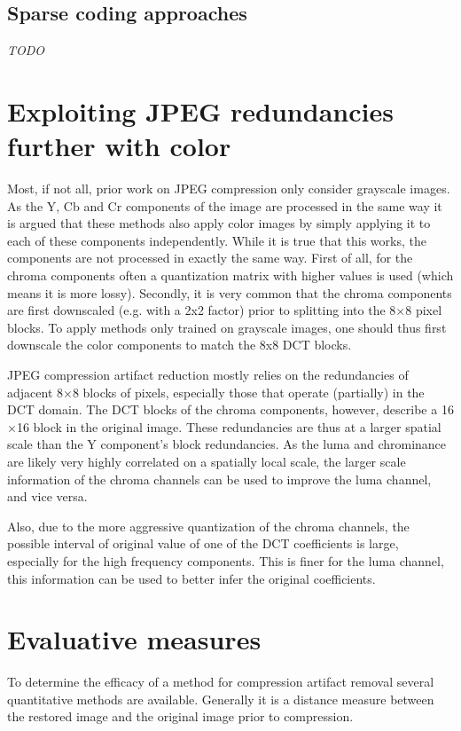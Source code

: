\subsection{Sparse coding approaches}
\textit{TODO}

\section{Exploiting JPEG redundancies further with color}
Most, if not all, prior work on JPEG compression only consider grayscale images. As the Y, Cb and Cr components of the image are processed in the same way it is argued that these methods also apply color images by simply applying it to each of these components independently. While it is true that this works, the components are not processed in exactly the same way. First of all, for the chroma components often a quantization matrix with higher values is used (which means it is more lossy). Secondly, it is very common that the chroma components are first downscaled (e.g. with a 2x2 factor) prior to splitting into the 8$\times$8 pixel blocks. To apply methods only trained on grayscale images, one should thus first downscale the color components to match the 8x8 DCT blocks. 

JPEG compression artifact reduction mostly relies on the redundancies of adjacent 8$\times$8 blocks of pixels, especially those that operate (partially) in the DCT domain. The DCT blocks of the chroma components, however, describe a 16$\times$16 block in the original image. These redundancies are thus at a larger spatial scale than the Y component's block redundancies. As the luma and chrominance are likely very highly correlated on a spatially local scale, the larger scale information of the chroma channels can be used to improve the luma channel, and vice versa.

Also, due to the more aggressive quantization of the chroma channels, the possible interval of original value of one of the DCT coefficients is large, especially for the high frequency components. This is finer for the luma channel, this information can be used to better infer the original coefficients.




\section{Evaluative measures}
To determine the efficacy of a method for compression artifact removal several quantitative methods are available. Generally it is a distance measure between the restored image and the original image prior to compression.


